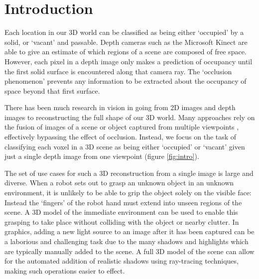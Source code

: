 \documentclass[10pt,twocolumn,letterpaper]{article}
\begin{document}
\section{Introduction}

Each location in our 3D world can be classified as being either `occupied' by a solid, or `vacant' and passable.
Depth cameras such as the Microsoft Kinect are able to give an estimate of which regions of a scene are composed of free space.
However, each pixel in a depth image only makes a prediction of occupancy until the first solid surface is encountered along that camera ray.
The `occlusion phenomenon' prevents any information to be extracted about the occupancy of space beyond that first surface.

There has been much research in vision in going from 2D images and depth images to reconstructing the full shape of our 3D world.
Many approaches rely on the fusion of images of a scene or object captured from multiple viewpoints \cite{izadi-uist-2011, vicente-cvpr-2014}, effectively bypassing the effect of occlusion.
Instead, we focus on the task of classifying each voxel in a 3D scene as being either `occupied' or `vacant' given just a single depth image from one viewpoint (figure \ref{fig:intro}).

The set of use cases for such a 3D reconstruction from a single image is large and diverse.
When a robot sets out to grasp an unknown object in an unknown environment, it is unlikely to be able to grip the object solely on the visible face: Instead the `fingers' of the robot hand must extend into unseen regions of the scene.
A 3D model of the immediate environment can be used to enable this grasping to take place without colliding with the object or nearby clutter.
In graphics, adding a new light source to an image after it has been captured can be a laborious and challenging task due to the many shadows and highlights which are typically manually added to the scene.
A full 3D model of the scene can allow for the automated addition of realistic shadows using ray-tracing techniques, making such operations easier to effect.
\end{document}
